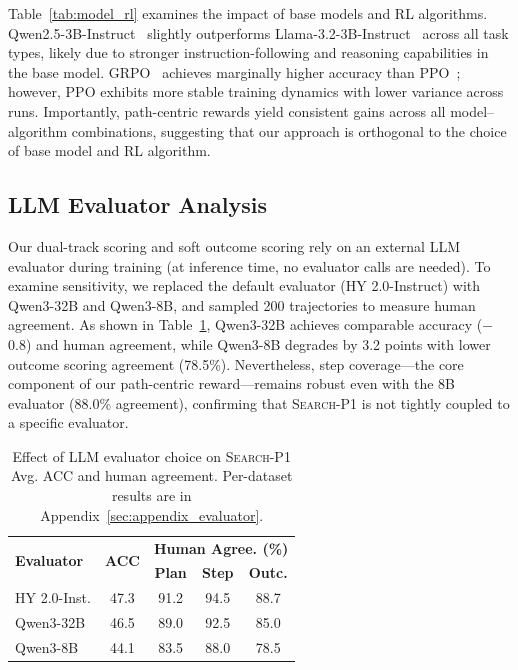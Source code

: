\documentclass[11pt]{article}
\newcommand{\method}{\textsc{Search-P1}\xspace}
\begin{document}
Table~\ref{tab:model_rl} examines the impact of base models and RL algorithms.
Qwen2.5-3B-Instruct~\cite{qwen2025qwen25technicalreport} slightly outperforms Llama-3.2-3B-Instruct~\cite{grattafiori2024llama3herdmodels} across all task types, likely due to stronger instruction-following and reasoning capabilities in the base model.
GRPO~\cite{shao2024deepseekmathpushinglimitsmathematical} achieves marginally higher accuracy than PPO~\cite{schulman2017proximalpolicyoptimizationalgorithms}; however, PPO exhibits more stable training dynamics with lower variance across runs.
Importantly, path-centric rewards yield consistent gains across all model--algorithm combinations, suggesting that our approach is orthogonal to the choice of base model and RL algorithm.

\subsection{LLM Evaluator Analysis}
\label{sec:evaluator_analysis}

Our dual-track scoring and soft outcome scoring rely on an external LLM evaluator during training (at inference time, no evaluator calls are needed).
To examine sensitivity, we replaced the default evaluator (HY 2.0-Instruct) with Qwen3-32B and Qwen3-8B, and sampled 200 trajectories to measure human agreement. As shown in Table~\ref{tab:evaluator}, Qwen3-32B achieves comparable accuracy ($-$0.8) and human agreement, while Qwen3-8B degrades by 3.2 points with lower outcome scoring agreement (78.5\%). Nevertheless, step coverage---the core component of our path-centric reward---remains robust even with the 8B evaluator (88.0\% agreement), confirming that \method is not tightly coupled to a specific evaluator.

\begin{table}[t]
\centering
\small
\setlength{\tabcolsep}{5.5pt}
\begin{tabular}{l|c|ccc}
\toprule
\multirow{2}{*}{\textbf{Evaluator}} & \multirow{2}{*}{\textbf{ACC}} & \multicolumn{3}{c}{\textbf{Human Agree. (\%)}} \\
& & \textbf{Plan} & \textbf{Step} & \textbf{Outc.} \\
\midrule
HY 2.0-Inst. & 47.3 & 91.2 & 94.5 & 88.7 \\
Qwen3-32B & 46.5 & 89.0 & 92.5 & 85.0 \\
Qwen3-8B & 44.1 & 83.5 & 88.0 & 78.5 \\
\bottomrule
\end{tabular}
\caption{Effect of LLM evaluator choice on \method Avg. ACC and human agreement. Per-dataset results are in Appendix~\ref{sec:appendix_evaluator}.}
\label{tab:evaluator}
\end{table}
\end{document}
